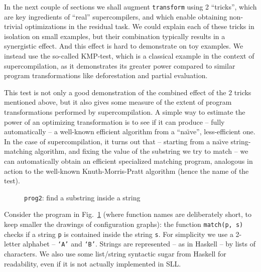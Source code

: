 In the next couple of sections we shall augment \texttt{transform} using 2 ``tricks'',
which are key ingredients of ``real'' supercompilers, and which enable obtaining
non-trivial optimizations in the residual task.
We could explain each of these tricks in isolation on small examples,
but their combination typically results in a synergistic effect.
And this effect is hard to demonstrate on toy examples.
We instead use the so-called KMP-test, which is
a classical example in the context of supercompilation, as it demonstrates its greater
power compared to similar program transformations like deforestation and partial 
evaluation\cite{Sorensen1994TurchinSupercompiler,Sorensen1998Introduction}.

This test is not only a good demonstration of the combined effect of the 2 tricks mentioned above,
but it also gives some measure of the extent of program transformations performed by supercompilation.
A simple way to estimate the power of an optimizing transformation is to see if it
can produce -- fully automatically -- a well-known efficient algorithm
from a ``na\"{\i}ve'', less-efficient one.
In the case of supercompilation, it turns out that
-- starting from a na\"{\i}ve string-matching algorithm, 
and fixing the value of the substring we try to match --
we can automatically obtain an efficient specialized matching program,
analogous in action to the well-known Knuth-Morris-Pratt algorithm \cite{Knuth1977Fast}
(hence the name of the test).

\begin{figure}[t!]
\caption{\texttt{prog2}: find a substring inside a string}
\label{fig:prog2}

\end{figure}

Consider the program in Fig.~\ref{fig:prog2}
(where function names are deliberately short, to keep smaller the drawings of configuration
graphs):
the function \texttt{match(p, s)} checks if a string \texttt{p}
is contained inside the string \texttt{s}.
For simplicity we use a 2-letter alphabet -- \texttt{`A'} and \texttt{`B'}. 
Strings are represented -- as in Haskell -- by lists of characters.
We also use some list/string syntactic sugar from
Haskell for readability, even if it is not actually implemented in SLL.

